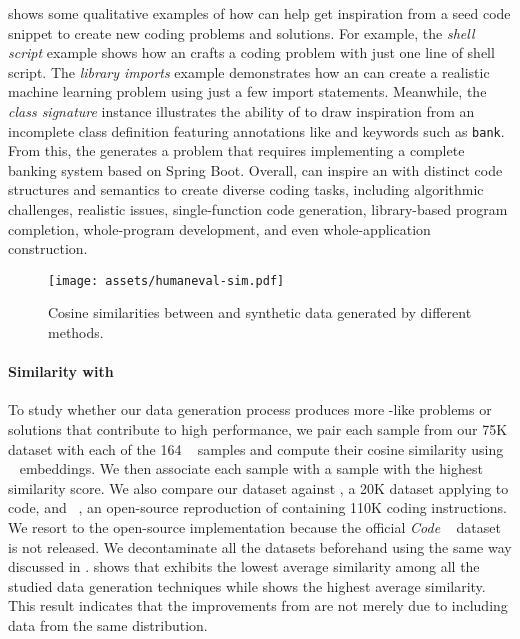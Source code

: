 shows some qualitative examples of how \tech{} can help \llm{} get inspiration from a seed code snippet to create new coding problems and solutions.
For example, the \emph{shell script} example shows how an \llm{} crafts a \python{} coding problem with just one line of shell script.
The \emph{library imports} example demonstrates how an \llm{} can create a realistic machine learning problem using just a few import statements. Meanwhile, the \emph{class signature} instance illustrates the ability of \llm{} to draw inspiration from an incomplete class definition featuring annotations like \texttt{\@SpringBootApplication} and keywords such as \texttt{bank}. From this, the \llm{} generates a problem that requires implementing a complete banking system based on Spring Boot.
Overall, \tech{} can inspire an \llm{} with distinct code structures and semantics to create diverse coding tasks, including algorithmic challenges, realistic issues, single-function code generation, library-based program completion, whole-program development, and even whole-application construction.

 

\begin{figure}
\centering
\texttt{[image: assets/humaneval-sim.pdf]}
\caption{Cosine similarities between \humaneval{} and synthetic data generated by different methods.}
\label{fig:humaneval-sim}
\end{figure}

\paragraph{Similarity with \humaneval{}}
\label{sec:humaneval-sim}
To study whether our data generation process produces more \humaneval-like problems or solutions that contribute to high performance,
we pair each sample from our 75K dataset with each of the 164 \humaneval{}~\cite{codex} samples and compute their cosine similarity using \tfidf{}~\cite{tfidf} embeddings.
We then associate each \tech{} sample with a \humaneval{} sample with the highest similarity score.
We also compare our dataset against \codealpaca, a 20K dataset applying \selfinstruct{} to code,
and \evolcode{}~\cite{evolcode}, an open-source reproduction of \evolinstruct{} containing 110K coding instructions.
We resort to the open-source implementation because the official \emph{Code \evolinstruct{}}~\cite{wizardcoder} dataset is not released.
We decontaminate all the datasets beforehand using the same way discussed in
.
 shows that \tech{} exhibits the lowest average similarity among all the studied data generation techniques while \selfinstruct{} shows the highest average similarity.
This result indicates that the improvements from \tech{} are not merely due to including data from the same distribution.

